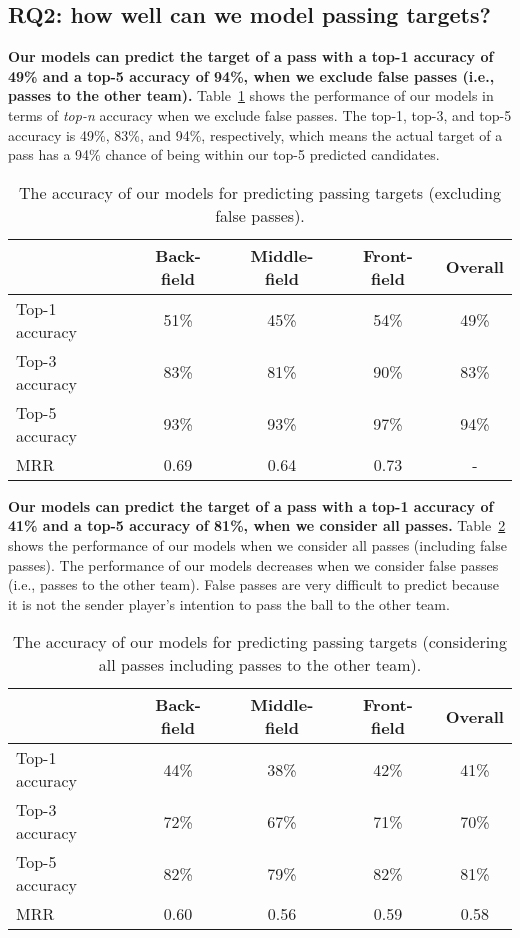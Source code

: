 \subsection{RQ2: how well can we model passing targets?}\label{RQ2-results}

\textbf{Our models can predict the target of a pass with a top-1 accuracy of 49\% and a top-5 accuracy of 94\%, when we exclude false passes (i.e., passes to the other team).}
Table~\ref{tab:performance-accurate-passes} shows the performance of our models in terms of \textit{top-n} accuracy when we exclude false passes. 
The top-1, top-3, and top-5 accuracy is 49\%, 83\%, and 94\%, respectively, which means the actual target of a pass has a 94\% chance of being within our top-5 predicted candidates.

\begin{table}[!t]
\caption{The accuracy of our models for predicting passing targets (excluding false passes).}
\centering
\begin{tabular}{lcccc}
  \hline
  & Back-field & Middle-field & Front-field & Overall \\
  \hline
  Top-1 accuracy & 51\% & 45\% & 54\% & 49\% \\
  Top-3 accuracy & 83\% & 81\% & 90\% & 83\% \\
  Top-5 accuracy & 93\% & 93\% & 97\% & 94\% \\
  MRR & 0.69 & 0.64 & 0.73 & - \\
  \hline
\end{tabular}
\label{tab:performance-accurate-passes}
\end{table}

\textbf{Our models can predict the target of a pass with a top-1 accuracy of 41\% and a top-5 accuracy of 81\%, when we consider all passes.}
Table~\ref{tab:performance-all-passes} shows the performance of our models when we consider all passes (including false passes). 
The performance of our models decreases when we consider false passes (i.e., passes to the other team). 
False passes are very difficult to predict because it is not the sender player's intention to pass the ball to the other team. 

\begin{table}[!t]
\caption{The accuracy of our models for predicting passing targets (considering all passes including passes to the other team).}
\centering
\begin{tabular}{lcccc}
  \hline
  & Back-field & Middle-field & Front-field & Overall \\
  \hline
  Top-1 accuracy & 44\% & 38\% & 42\% & 41\% \\
  Top-3 accuracy & 72\% & 67\% & 71\% & 70\% \\
  Top-5 accuracy & 82\% & 79\% & 82\% & 81\% \\
  MRR & 0.60 & 0.56 & 0.59 & 0.58 \\

  \hline
\end{tabular}
\label{tab:performance-all-passes}
\end{table}

